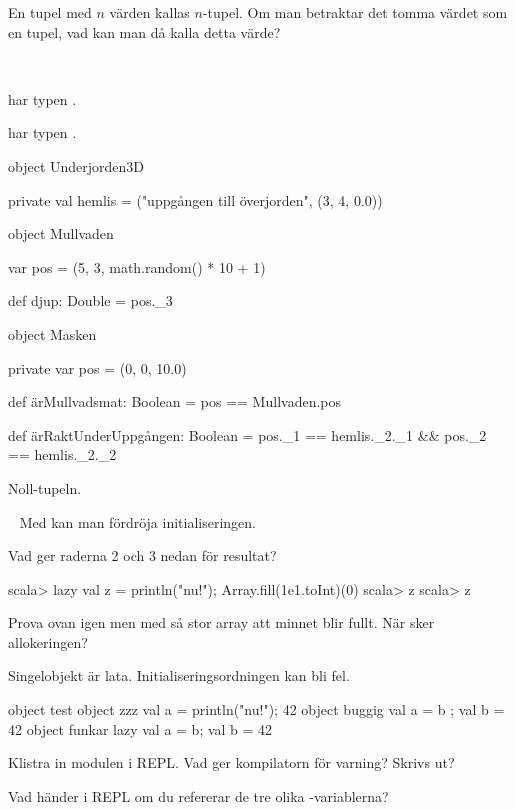 \Subtask En tupel med $n$ värden kallas $n$-tupel. Om man betraktar det tomma värdet  \code{()} som en tupel, vad kan man då kalla detta värde?

\SOLUTION

\TaskSolved \what~

\SubtaskSolved {} har typen .

\SubtaskSolved {} har typen .


\SubtaskSolved
\begin{Code}
object Underjorden3D {
  private val hemlis = ("uppgången till överjorden", (3, 4, 0.0))

  object Mullvaden {
    var pos = (5, 3, math.random() * 10 + 1)

    def djup: Double  = pos._3
  }

  object Masken {
    private var pos = (0, 0, 10.0)

    def ärMullvadsmat: Boolean = pos == Mullvaden.pos

    def ärRaktUnderUppgången: Boolean =
      pos._1 == hemlis._2._1 && pos._2 == hemlis._2._2
  }
}
\end{Code}

\SubtaskSolved Noll-tupeln.

\QUESTEND



\QUESTBEGIN

\Task \what~ Med  kan man fördröja initialiseringen.

\Subtask Vad ger raderna 2 och 3 nedan för resultat?
\begin{REPL}
scala> lazy val z = { println("nu!"); Array.fill(1e1.toInt)(0)}
scala> z
scala> z
\end{REPL}

\Subtask Prova ovan igen men med så stor array att minnet blir fullt. När sker allokeringen?

\Subtask Singelobjekt är lata. Initialiseringsordningen kan bli fel.
\begin{Code}
object test {
  object zzz    { val a = { println("nu!"); 42} }
  object buggig { val a = b ; val b = 42        }
  object funkar { lazy val a = b; val b = 42    }
}
\end{Code}
\noindent Klistra in modulen  i REPL. Vad ger kompilatorn för varning? Skrivs   ut?

\Subtask Vad händer i REPL om du refererar de tre olika -variablerna?

